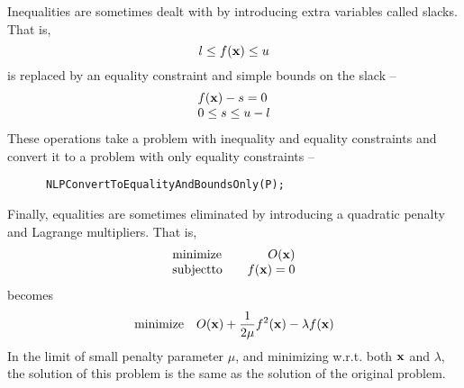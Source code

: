 \documentclass[12pt]{article}
\begin{document}
    Inequalities are sometimes dealt with by introducing extra variables called slacks. That is,
    \begin{displaymath}
      l\leq f({\bf x})\leq u
    \end{displaymath}
    is replaced by an equality constraint and simple bounds on the slack --
    \begin{displaymath}
    \begin{array}{l}
      \displaystyle f({\bf x})-s =0 \\
      \displaystyle 0\leq s \leq u-l\\
    \end{array}
    \end{displaymath}
    These operations take a problem with inequality and equality constraints and convert it to a problem
    with only equality constraints --
    \begin{verbatim}
      NLPConvertToEqualityAndBoundsOnly(P);
    \end{verbatim}

    Finally, equalities are sometimes eliminated by introducing a quadratic penalty and Lagrange multipliers.
    That is, 
    \begin{displaymath}
    \begin{array}{lr}
      \displaystyle {\rm minimize}&\displaystyle\quad O({\bf x}) \\
      \displaystyle {\rm subject to}& \displaystyle\quad f({\bf x})=0\\
    \end{array}
    \end{displaymath}
    becomes
    \begin{displaymath}
      {\rm minimize}\quad O({\bf x}) + {1\over{2\mu}}f^2({\bf x})-\lambda f({\bf x})
    \end{displaymath}
    In the limit of small penalty parameter $\mu$, and minimizing w.r.t. both ${\bf x}$ and $\lambda$, the
    solution of this problem is the same as the solution of the original problem.
\end{document}
